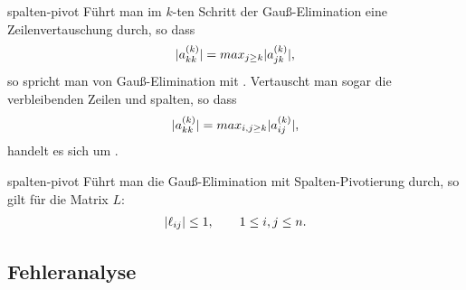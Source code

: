 \begin{Definition}{spalten-pivot}
  Führt man im $k$-ten Schritt der Gauß-Elimination eine
  Zeilenvertauschung durch, so dass
  \begin{gather}
    \lvert a^{(k)}_{kk}\rvert = max_{j\ge k} \lvert a^{(k)}_{jk}\rvert,
  \end{gather}
  so spricht man von Gauß-Elimination mit
  . Vertauscht man sogar die verbleibenden
  Zeilen und spalten, so dass
  \begin{gather}
    \lvert a^{(k)}_{kk}\rvert = max_{i,j\ge k} \lvert a^{(k)}_{ij}\rvert,
  \end{gather}
  handelt es sich um .
\end{Definition}

\begin{Lemma}{spalten-pivot}
  Führt man die Gauß-Elimination mit Spalten-Pivotierung durch, so gilt
  für die Matrix $L$:
  \begin{gather}
    \lvert\ell_{ij}\rvert \le 1,\qquad1\le i,j\le n.
  \end{gather}
\end{Lemma}

\subsection{Fehleranalyse}


